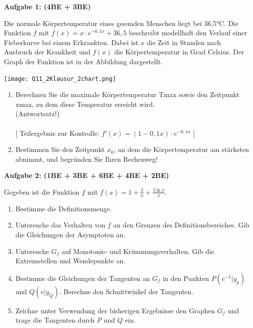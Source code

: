 \documentclass[a4paper,12pt]{article}
\newcommand{\Aufgabe}[1]{
  {
  \vspace*{0.5cm}
  \textsf{\textbf{Aufgabe #1}}
  \vspace*{0.2cm}
  
  }
}
\begin{document}
\vspace{5cm}

\newpage


\Aufgabe{1: (4BE + 3BE)}
Die normale Körpertemperatur eines gesunden Menschen liegt bei 36,5°C.  Die Funktion $f$ mit $f(x) = x \cdot e^{-0,1x} + 36,5$ beschreibt modellhaft den Verlauf einer Fieberkurve bei einem Erkrankten.  Dabei ist $x$ die Zeit in Stunden nach Ausbruch der Krankheit und $f(x)$ die Körpertemperatur in Grad Celsius. Der Graph der Funktion ist in der Abbildung dargestellt.

\begin{center}
\texttt{[image: Q11\_2Klausur\_2chart.png]}
\end{center}

\begin{enumerate}[label={\alph*)}]
  \item Berechnen Sie die maximale Körpertemperatur Tmax sowie den Zeitpunkt xmax, zu dem diese Temperatur erreicht wird.\\
(Antwortsatz!)\\
\\
    {[ Teilergebnis zur Kontrolle: $f'(x) = (1-0,1x) \cdot e^{-0,1x}$ ]}
  \item Bestimmen Sie den Zeitpunkt $x_0$, an dem die Körpertemperatur am stärksten abnimmt, und begründen Sie Ihren Rechenweg!
\end{enumerate}

\newpage

\Aufgabe{2: (1BE + 3BE + 6BE + 4BE + 2BE)} 

Gegeben ist die Funktion $f$ mit $f(x)=1+\frac{3}{x}+\frac{3 \ln x}{x}$.

\begin{enumerate}[label={\alph*)}]
  \item Bestimme die Definitionsmenge.
  \item Untersuche das Verhalten von $f$ an den Grenzen des Definitionsbereiches. Gib die Gleichungen der Asymptoten an.
  \item Untersuche $G_f$ auf Monotonie- und Krümmungsverhalten. Gib die Extremstellen und Wendepunkte an.
  \item Bestimme die Gleichungen der Tangenten an $G_f$ in den Punkten $P(e^{-1} | y_p)$ und $Q(e|y_Q)$. Berechne den Schnittwinkel der Tangenten. 
  \item Zeichne unter Verwendung der bisherigen Ergebnisse den Graphen $G_f$ und trage die Tangenten durch $P$ und $Q$ ein.
\end{enumerate}
\end{document}
